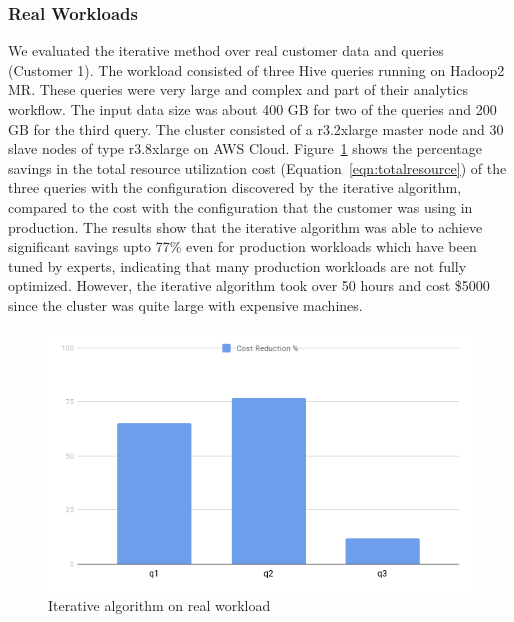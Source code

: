 \subsubsection*{Real Workloads}
We evaluated the iterative method over real customer data and queries (Customer 1). The workload consisted of three Hive queries running on Hadoop2 MR. These queries were very large and complex and part of their analytics workflow. The input data size was about 400 GB for two of the queries and 200 GB for the third query. The cluster consisted of a r3.2xlarge master node and 30 slave nodes of type r3.8xlarge on AWS Cloud. Figure~\ref{fig:iterativelyft} shows the percentage savings in the total resource utilization cost (Equation~\ref{eqn:totalresource}) of the three queries with the configuration discovered by the iterative algorithm, compared to the cost with the configuration that the customer was using in production. The results show that the iterative algorithm was able to achieve significant savings upto 77\% even for production workloads which have been tuned by experts, indicating that many production workloads are not fully optimized. However, the iterative algorithm took over 50 hours and cost \$5000 since the cluster was quite large with expensive machines. 
\begin{figure}[h]
	\includegraphics[width=\linewidth]{fig/lyft.png}
	\caption{Iterative algorithm on real workload}
	\label{fig:iterativelyft}
\end{figure}

